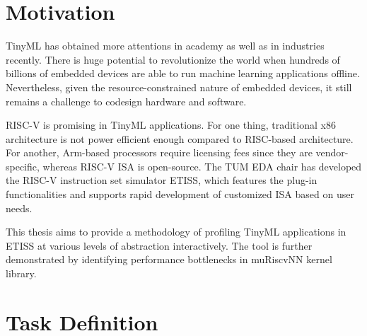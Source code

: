 
\section{Motivation}

TinyML has obtained more attentions in academy as well as in industries recently. There is huge potential to revolutionize the world when hundreds of billions of embedded devices are able to
run machine learning applications offline. Nevertheless, given the resource-constrained nature of embedded devices, it still remains a challenge to codesign hardware and software.

\noindent RISC-V is promising in TinyML applications. For one thing, traditional x86 architecture is not power efficient enough compared to RISC-based architecture.
For another, Arm-based processors require licensing fees since they are vendor-specific, whereas RISC-V ISA is open-source.
The TUM EDA chair has developed the RISC-V instruction set simulator ETISS, which features the plug-in functionalities and supports rapid development of customized ISA based on user needs.

\noindent This thesis aims to provide a methodology of profiling TinyML applications in ETISS at various levels of abstraction interactively. The tool is further demonstrated by identifying
performance bottlenecks in muRiscvNN kernel library. 

\section{Task Definition}